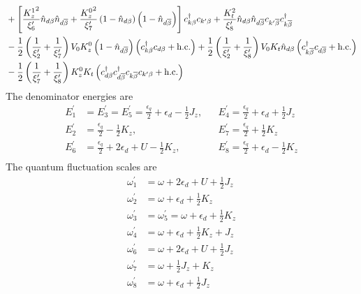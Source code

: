 \documentclass[12pt,twoside]{report}
\numberwithin{equation}{section}
\begin{document}
\begin{equation}
\begin{aligned}
&+\left[\frac{{K_z^1}^2}{\xi^\prime_6}\hat n_{d\beta}\hat n_{d\overline\beta} + \frac{{K_z^0}^2}{\xi^\prime_7}\left(1 - \hat n_{d\beta}\right)\left(1 - \hat n_{d\overline\beta}\right)\right]c^\dagger_{k\beta}c_{k^\prime\beta} + \frac{K_t^2}{\xi^\prime_8}\hat n_{d\beta}\hat n_{d\overline\beta}c_{k^\prime\overline\beta}c^\dagger_{k\overline\beta} \\
&- \frac{1}{2}\left(\frac{1}{\xi^\prime_2} + \frac{1}{\xi^\prime_7}\right)V_0 K_z^0\left(1 - \hat n_{d\overline\beta}\right)\left(c^\dagger_{k\beta}c_{d\beta} + \text{h.c.}\right) + \frac{1}{2}\left(\frac{1}{\xi^\prime_2} + \frac{1}{\xi^\prime_8}\right)V_0 K_t\hat n_{d\beta}\left(c^\dagger_{k\overline\beta}c_{d\overline\beta} + \text{h.c.}\right) \\
&- \frac{1}{2}\left(\frac{1}{\xi^\prime_7} + \frac{1}{\xi^\prime_8}\right)K_z^0 K_t\left(c^\dagger_{d\beta}c^\dagger_{d\overline\beta}c_{k\overline\beta}c_{k^\prime\beta} + \text{h.c.}\right) 
\end{aligned}\end{equation}
The denominator energies are
\begin{equation}\begin{aligned}
	E_1^\prime &= E_3^\prime = E_5^\prime = \frac{\epsilon_q}{2} + \epsilon_d - \frac{1}{2}J_z, &&E_4^\prime = \frac{\epsilon_q}{2} + \epsilon_d + \frac{1}{2}J_z\\
	E_2^\prime &= \frac{\epsilon_q}{2} - \frac{1}{2}K_z, &&E_7^\prime = \frac{\epsilon_q}{2} + \frac{1}{2}K_z\\
	E_6^\prime &= \frac{\epsilon_q}{2} + 2\epsilon_d + U - \frac{1}{2}K_z, &&E_8^\prime = \frac{\epsilon_q}{2} + \epsilon_d - \frac{1}{2}K_z\\
\end{aligned}\end{equation}
The quantum fluctuation scales are
\begin{equation}\begin{aligned}
	\omega_1^\prime&=\omega+2\epsilon_d+U+\frac{1}{2}J_z\\
	\omega_2^\prime&=\omega+\epsilon_d+\frac{1}{2}K_z \\
	\omega_3^\prime&=\omega_5^\prime=\omega+\epsilon_d + \frac{1}{2}K_z\\
	\omega_4^\prime&=\omega+\epsilon_d+\frac{1}{2}K_z + J_z \\
	\omega_6^\prime&=\omega+2\epsilon_d+U+\frac{1}{2}J_z\\
	\omega_7^\prime&=\omega+\frac{1}{2}J_z + K_z\\
	\omega_8^\prime &=\omega+\epsilon_d+\frac{1}{2}J_z \\
\end{aligned}\end{equation}
\end{document}
